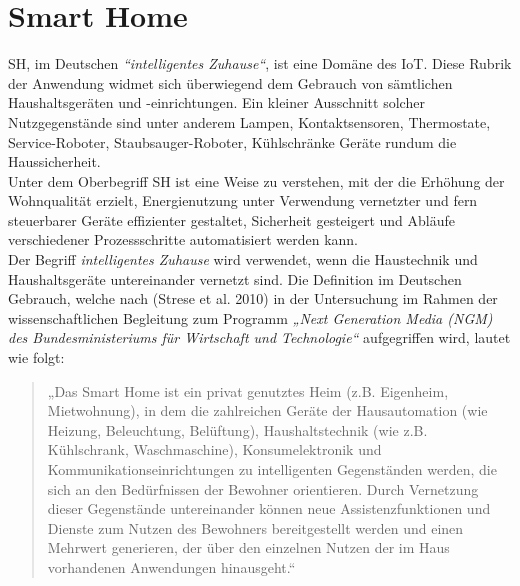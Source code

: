 
\section{Smart Home}
\label{sec:smartHome}
    \acl{SH}, im Deutschen \textit{“intelligentes Zuhause“}, ist eine Domäne des \acs{IoT}. 
    Diese Rubrik der Anwendung widmet sich überwiegend dem Gebrauch von sämtlichen Haushaltsgeräten 
    und -einrichtungen. Ein kleiner Ausschnitt solcher Nutzgegenstände sind unter anderem Lampen, Kontaktsensoren, 
    Thermostate, Service-Roboter, Staubsauger-Roboter, Kühlschränke Geräte rundum die Haussicherheit. 
    \\ 
    Unter dem Oberbegriff \acl{SH} ist eine Weise zu verstehen, mit der die Erhöhung der Wohnqualität erzielt, 
    Energienutzung unter Verwendung vernetzter und fern steuerbarer Geräte effizienter gestaltet, Sicherheit gesteigert 
    und Abläufe verschiedener Prozessschritte automatisiert werden kann.
    \\ 
    Der Begriff \textit{intelligentes Zuhause} wird verwendet, wenn die Haustechnik und Haushaltsgeräte untereinander 
    vernetzt sind. Die Definition im Deutschen Gebrauch, welche nach (Strese et al. 2010) in der Untersuchung im Rahmen 
    der wissenschaftlichen Begleitung zum Programm \textit{„Next Generation Media (NGM) des Bundesministeriums für Wirtschaft und Technologie“} 
    aufgegriffen wird, lautet wie folgt: 
    \begin{quote}
        „Das Smart Home ist ein privat genutztes Heim (z.B. Eigenheim, Mietwohnung), in dem die zahlreichen Geräte der 
        Hausautomation (wie Heizung, Beleuchtung, Belüftung), Haushaltstechnik (wie z.B. Kühlschrank, Waschmaschine), 
        Konsumelektronik und Kommunikationseinrichtungen zu intelligenten Gegenständen werden, die sich an den 
        Bedürfnissen der Bewohner orientieren. Durch Vernetzung dieser Gegenstände untereinander können neue 
        Assistenzfunktionen und Dienste zum Nutzen des Bewohners bereitgestellt werden und einen Mehrwert 
        generieren, der über den einzelnen Nutzen der im Haus vorhandenen Anwendungen hinausgeht.“ \cite{strese.2010m}
    \end{quote}
